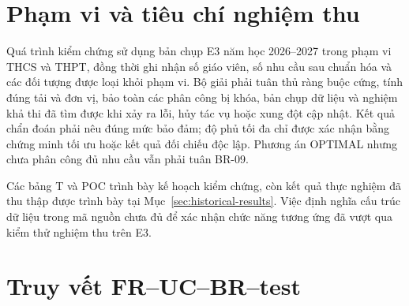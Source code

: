 \documentclass[12pt,a4paper]{report}
\begin{document}
\section{Phạm vi và tiêu chí nghiệm thu}\label{sec:acceptance}
Quá trình kiểm chứng sử dụng bản chụp E3 năm học 2026--2027 trong phạm vi THCS và THPT, đồng thời ghi nhận số giáo viên, số nhu cầu sau chuẩn hóa và các đối tượng được loại khỏi phạm vi. Bộ giải phải tuân thủ ràng buộc cứng, tính đúng tải và đơn vị, bảo toàn các phân công bị khóa, bản chụp dữ liệu và nghiệm khả thi đã tìm được khi xảy ra lỗi, hủy tác vụ hoặc xung đột cập nhật. Kết quả chẩn đoán phải nêu đúng mức bảo đảm; độ phủ tối đa chỉ được xác nhận bằng chứng minh tối ưu hoặc kết quả đối chiếu độc lập. Phương án OPTIMAL nhưng chưa phân công đủ nhu cầu vẫn phải tuân BR-09.

Các bảng T và POC trình bày kế hoạch kiểm chứng, còn kết quả thực nghiệm đã thu thập được trình bày tại Mục~\ref{sec:historical-results}. Việc định nghĩa cấu trúc dữ liệu trong mã nguồn chưa đủ để xác nhận chức năng tương ứng đã vượt qua kiểm thử nghiệm thu trên E3.

\section{Truy vết FR--UC--BR--test}\label{sec:traceability}
\end{document}
